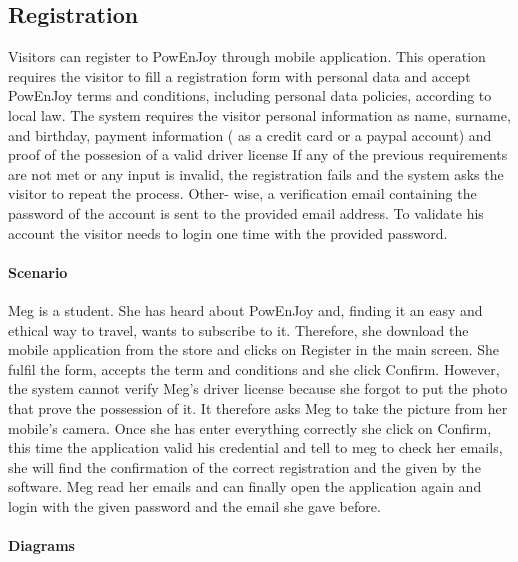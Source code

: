 \subsection{Registration}
Visitors can register to PowEnJoy through mobile application. This operation requires the visitor to fill a registration form with personal data and accept PowEnJoy terms and conditions, including personal data policies, according to local law. The system requires the visitor personal information as name, surname, and birthday, payment information ( as a credit card or a paypal account) and proof of the possesion of a valid driver license
If any of the previous requirements are not met or any input is invalid, the registration fails and the system asks the visitor to repeat the process. Other- wise, a verification email containing the password of the account is sent to the provided email address. To validate his account the visitor needs to login one time with the provided password.
\paragraph{Scenario}
Meg is a student. She has heard about PowEnJoy and, finding it an easy and ethical way to travel, wants to subscribe to it.
Therefore, she download the mobile application from the store and clicks on Register in the main screen. She fulfil the form, accepts the term and conditions  and she click Confirm. However, the system cannot verify Meg's driver license because she forgot to put the photo that prove the possession of it. It therefore asks Meg to take the picture from her mobile's camera. Once she has enter everything correctly she click on Confirm, this time the application valid his credential and tell to meg to check her emails, she will find the confirmation of the correct registration and the given by the software. Meg read her emails and can finally open the application again and login with the given password and the email she gave before.
\paragraph{Diagrams}
